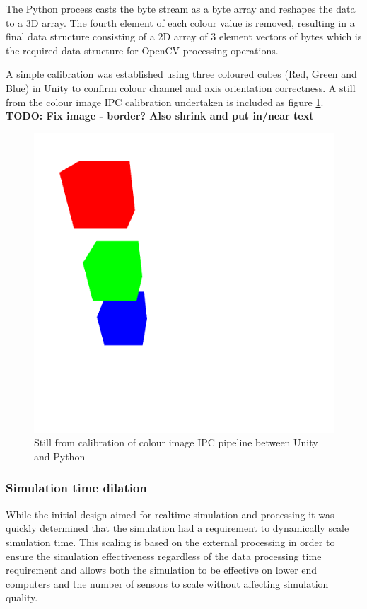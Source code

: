 \documentclass[]{aiaa-tc}%
\begin{document}
The Python process casts the byte stream as a byte array and reshapes the data to a 3D array. The fourth element of each colour value is removed, resulting in a final data structure consisting of a 2D array of 3 element vectors of bytes which is the required data structure for OpenCV processing operations. 

A simple calibration was established using three coloured cubes (Red, Green and Blue) in Unity to confirm colour channel and axis orientation correctness. A still from the colour image IPC calibration undertaken is included as figure \ref{f:unity_calibration}. \textbf{TODO: Fix image - border? Also shrink and put in/near text}


\begin{figure} %
	\centering
	\includegraphics[width=0.5\linewidth, height=0.5\linewidth]{unity_calibration.png}
	\caption{Still from calibration of colour image IPC pipeline between Unity and Python}
	\label{f:unity_calibration}
\end{figure}

\subsubsection{Simulation time dilation}\label{sect:timedilation}

While the initial design aimed for realtime simulation and processing it was quickly determined that the simulation had a requirement to dynamically scale simulation time. This scaling is based on the external processing in order to ensure the simulation effectiveness regardless of the data processing time requirement and allows both the simulation to be effective on lower end computers and the number of sensors to scale without affecting simulation quality.
\end{document}
